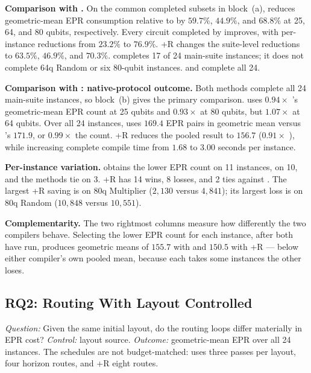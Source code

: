 \textbf{Comparison with \TeleSABRE{}.} On the common completed subsets in
block~(a), \PORTER{} reduces geometric-mean EPR consumption relative to
\TeleSABRE{} by $59.7\%$, $44.9\%$, and $68.8\%$ at 25, 64, and 80 qubits,
respectively. Every circuit completed by \TeleSABRE{} improves, with
per-instance reductions from $23.2\%$ to $76.9\%$. \PORTER{}+R changes the
suite-level reductions to $63.5\%$, $46.9\%$, and $70.3\%$.
\TeleSABRE{} completes 17 of 24 main-suite instances; it does not complete
64q Random or six 80-qubit instances. \PORTER{} and \dSABRE{} complete all
24.

\textbf{Comparison with \dSABRE{}: native-protocol outcome.} Both methods
complete all 24 main-suite instances, so block~(b) gives the primary
comparison. \PORTER{} uses $0.94\times$ \dSABRE{}'s geometric-mean EPR
count at 25 qubits and $0.93\times$ at 80 qubits, but $1.07\times$ at
64 qubits. Over all 24 instances, \PORTER{} uses $169.4$ EPR pairs in
geometric mean versus \dSABRE{}'s $171.9$, or $0.99\times$ the \dSABRE{}
count. \PORTER{}+R reduces the pooled result to $156.7$
($0.91\times$ \dSABRE{}), while increasing complete compile time from $1.68$
to $3.00$ seconds per instance.

\textbf{Per-instance variation.} \PORTER{} obtains the lower EPR count on
11 instances, \dSABRE{} on 10, and the methods tie on 3. \PORTER{}+R has
14 wins, 8 losses, and 2 ties against \dSABRE{}. The largest
\PORTER{}+R saving is on 80q Multiplier ($2{,}130$ versus $4{,}841$); its largest
loss is on 80q Random ($10{,}848$ versus $10{,}551$).

\textbf{Complementarity.} The two rightmost columns measure how differently
the two compilers behave. Selecting the lower EPR count for each instance,
after both have run, produces geometric means of $155.7$ with \PORTER{} and
$150.5$ with \PORTER{}+R --- below either compiler's own pooled mean, because
each takes some instances the other loses.

\subsection{RQ2: Routing With Layout Controlled}
\label{sec:shared_results}

\emph{Question:} Given the same initial layout, do the routing loops differ
materially in EPR cost? \emph{Control:} layout source. \emph{Outcome:}
geometric-mean EPR over all 24 instances. The schedules are not
budget-matched: \dSABRE{} uses three passes per layout, \PORTER{} four
horizon routes, and \PORTER{}+R eight routes.


